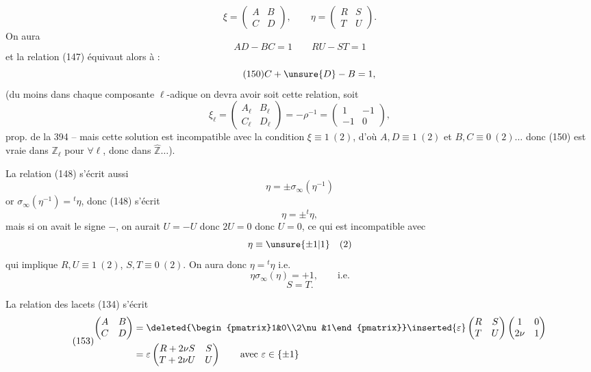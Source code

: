 \[
\tag{148}
\xi=\begin{pmatrix}A&B\\C&D\end{pmatrix},\qquad
\eta=\begin{pmatrix}R&S\\T&U\end{pmatrix}.
\]
On aura
\[
\tag{149}
AD-BC=1\qquad RU-ST=1
\]
et la relation (147) équivaut alors à :
\[
\tag{150}
C+\unsure{D}-B=1,
\]
 (du moins dans chaque composante $\ell$-adique on devra avoir soit cette relation, soit
\[
\xi_\ell=\begin{pmatrix}A_\ell&B_\ell\\C_\ell&D_\ell\end{pmatrix}
=-\rho^{-1}=\begin{pmatrix}1&-1\\-1&0\end{pmatrix},
\]
 prop. de la  394 -- mais cette solution est incompatible avec la condition $\boxed{\xi\equiv1\ (2)}$, d'où $A,D\equiv1\ (2)$ et $B,C\equiv0\ (2)\ldots$ donc (150) est vraie dans $\mathbb Z_\ell$ pour $\forall\ell$, donc dans $\widehat{\mathbb Z}\ldots$).


La relation (148) s'écrit aussi
\[
\eta=\pm\sigma_\infty(\eta^{-1})
\]
or $\sigma_\infty(\eta^{-1})={}^t\eta$, donc (148) s'écrit
\[
\eta=\pm{}^t\eta,
\]
mais si on avait le signe $-$, on aurait $U=-U$ donc $2U=0$ donc $U=0$, ce qui est incompatible avec
\[
\eta\equiv\unsure{\pm1|1}\quad(2)
\]
qui implique $R,U\equiv1\ (2)$, $S,T\equiv0\ (2)$. On aura donc $\eta={}^t\eta$ i.e.
\[
\tag{151}
\eta\sigma_\infty(\eta)=+1,\qquad\text{i.e.}
\]
\[
\tag{152}
S=T.
\]

La relation des lacets (134) s'écrit
\[
\tag{153}
\begin{aligned}
\begin{pmatrix}A&B\\C&D\end{pmatrix}
&=\deleted{\begin{pmatrix}1&0\\2\nu&1\end{pmatrix}}
\inserted{\varepsilon}\begin{pmatrix}R&S\\T&U\end{pmatrix}
\begin{pmatrix}1&0\\2\nu&1\end{pmatrix}\\
&=\varepsilon\begin{pmatrix}R+2\nu S&S\\T+2\nu U&U\end{pmatrix}
\qquad\text{avec }\varepsilon\in\{\pm1\}
\end{aligned}
\]

